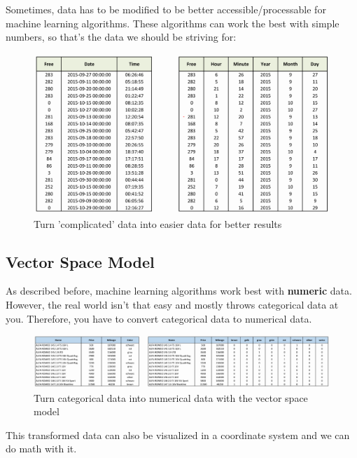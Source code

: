 \documentclass[11pt]{article}
\begin{document}
Sometimes, data has to be modified to be better accessible/processable for machine learning algorithms. These algorithms can work the best with simple numbers, so that's the data we should be striving for:

\begin{figure}[htb!]
    \centering
    \includegraphics[keepaspectratio=true, width=\linewidth]{feature_engineering.png}
    \caption{Turn 'complicated' data into easier data for better results}
    \label{fig:feature_engineering}
\end{figure}

\subsection{Vector Space Model}

As described before, machine learning algorithms work best with \textbf{numeric} data. However, the real world isn't that easy and mostly throws categorical data at you. Therefore, you have to convert categorical data to numerical data.

\begin{figure}[htb!]
    \centering
    \includegraphics[keepaspectratio=true, width=\linewidth]{vector_space_model.png}
    \caption{Turn categorical data into numerical data with the vector space model}
    \label{fig:vector_space_modefig}
\end{figure}

This transformed data can also be visualized in a coordinate system and we can do math with it.
\end{document}
